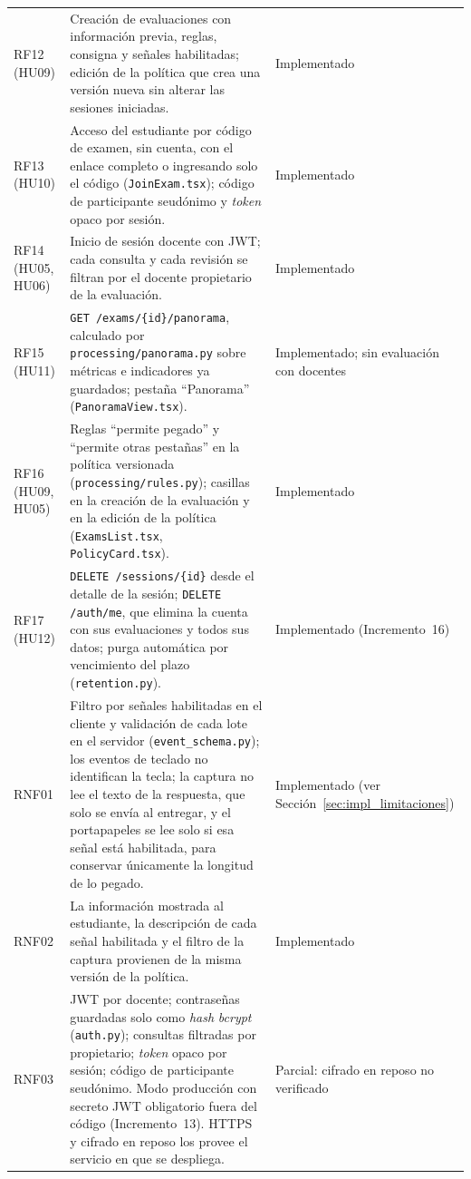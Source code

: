 {\begin{longtable}{>{\raggedright\arraybackslash}p{2.6cm} >{\raggedright\arraybackslash}p{8.2cm} >{\raggedright\arraybackslash}p{2.4cm}}
    RF12 (HU09) & Creación de evaluaciones con información previa, reglas, consigna y señales habilitadas; edición de la política que crea una versión nueva sin alterar las sesiones iniciadas. & Implementado \\
    RF13 (HU10) & Acceso del estudiante por código de examen, sin cuenta, con el enlace completo o ingresando solo el código (\texttt{JoinExam.tsx}); código de participante seudónimo y \textit{token} opaco por sesión. & Implementado \\
    RF14 (HU05, HU06) & Inicio de sesión docente con JWT; cada consulta y cada revisión se filtran por el docente propietario de la evaluación. & Implementado \\
    RF15 (HU11) & \texttt{GET /exams/\{id\}/panorama}, calculado por \texttt{processing/panorama.py} sobre métricas e indicadores ya guardados; pestaña ``Panorama'' (\texttt{PanoramaView.tsx}). & Implementado; sin evaluación con docentes \\
    RF16 (HU09, HU05) & Reglas ``permite pegado'' y ``permite otras pestañas'' en la política versionada (\texttt{processing/rules.py}); casillas en la creación de la evaluación y en la edición de la política (\texttt{ExamsList.tsx}, \texttt{PolicyCard.tsx}). & Implementado \\
    RF17 (HU12) & \texttt{DELETE /sessions/\{id\}} desde el detalle de la sesión; \texttt{DELETE /auth/me}, que elimina la cuenta con sus evaluaciones y todos sus datos; purga automática por vencimiento del plazo (\texttt{retention.py}). & Implementado (Incremento~16) \\
    RNF01 & Filtro por señales habilitadas en el cliente y validación de cada lote en el servidor (\texttt{event\_schema.py}); los eventos de teclado no identifican la tecla; la captura no lee el texto de la respuesta, que solo se envía al entregar, y el portapapeles se lee solo si esa señal está habilitada, para conservar únicamente la longitud de lo pegado. & Implementado (ver Sección~\ref{sec:impl_limitaciones}) \\
    RNF02 & La información mostrada al estudiante, la descripción de cada señal habilitada y el filtro de la captura provienen de la misma versión de la política. & Implementado \\
    RNF03 & JWT por docente; contraseñas guardadas solo como \textit{hash} \textit{bcrypt} (\texttt{auth.py}); consultas filtradas por propietario; \textit{token} opaco por sesión; código de participante seudónimo. Modo producción con secreto JWT obligatorio fuera del código (Incremento~13). HTTPS y cifrado en reposo los provee el servicio en que se despliega. & Parcial: cifrado en reposo no verificado \\

\end{longtable}}
